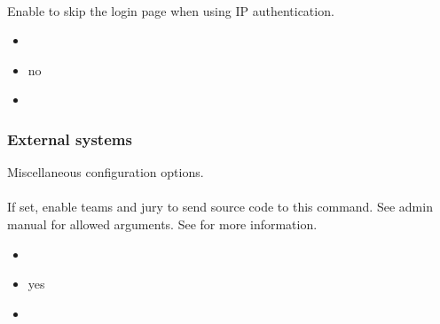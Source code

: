 \documentclass[a4paper,10pt,english,openany]{sphinxmanual}
\begin{document}
\paragraph{}
\label{\detokenize{configuration-reference:ip-autologin}}
\sphinxAtStartPar
Enable to skip the login page when using IP authentication.
\begin{itemize}
\item {} 
\sphinxAtStartPar
{} 

\item {} 
\sphinxAtStartPar
{} no

\item {} 
\sphinxAtStartPar
{} 

\end{itemize}


\subsubsection{External systems}
\label{\detokenize{configuration-reference:external-systems}}
\sphinxAtStartPar
Miscellaneous configuration options.


\paragraph{}
\label{\detokenize{configuration-reference:print-command}}
\sphinxAtStartPar
If set, enable teams and jury to send source code to this command. See admin manual for allowed arguments. See {\hyperref[\detokenize{config-advanced:printing}]{}} for more information.
\begin{itemize}
\item {} 
\sphinxAtStartPar
{} 

\item {} 
\sphinxAtStartPar
{} yes

\item {} 
\sphinxAtStartPar
{} \sphinxcode{\sphinxupquote{\textquotesingle{}\textquotesingle{}}}

\end{itemize}
\end{document}
